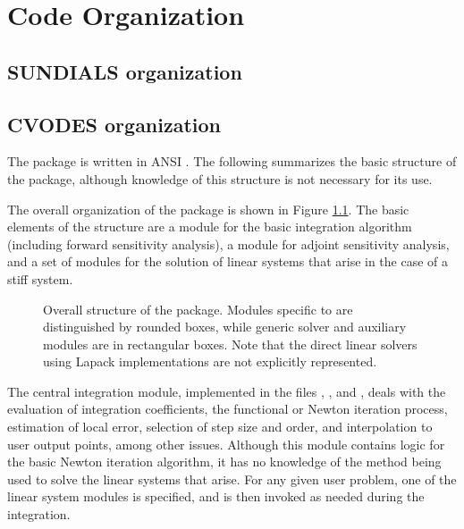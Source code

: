 \chapter{Code Organization}\label{s:organization}

\section{SUNDIALS organization}\label{ss:sun_org}


\section{CVODES organization}\label{ss:cvodes_org}

The {\cvodes} package is written in ANSI {\C}. The following
summarizes the basic structure of the package, although knowledge
of this structure is not necessary for its use.

The overall organization of the {\cvodes} package is shown in Figure
\ref{f:cvsorg}.  The basic elements of the structure are a module for
the basic integration algorithm (including forward sensitivity analysis),
a module for adjoint sensitivity analysis, and a set of modules for the solution
of linear systems that arise in the case of a stiff system.  
\begin{figure}
{\centerline{}}
\caption [Overall structure of the CVODES package]
{Overall structure of the {\cvodes} package.
  Modules specific to {\cvodes} are distinguished by rounded boxes, while 
  generic solver and auxiliary modules are in rectangular boxes. 
  Note that the direct linear solvers using Lapack implementations are not 
  explicitly represented.}
\label{f:cvsorg}
\end{figure}
The central integration module, implemented in the files ,
, and , deals 
with the evaluation of integration coefficients,
the functional or Newton iteration process, estimation of local error,
selection of step size and order, and interpolation to user output
points, among other issues.  Although this module contains logic for
the basic Newton iteration algorithm, it has no knowledge of the
method being used to solve the linear systems that arise.  For any
given user problem, one of the linear system modules is specified, and
is then invoked as needed during the integration. 

